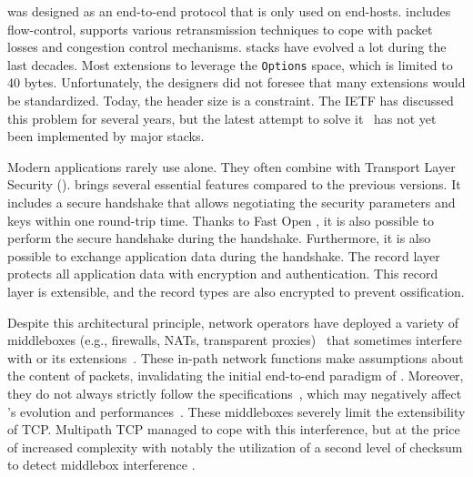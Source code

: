 

\tcp was designed as an end-to-end protocol that is only used on end-hosts.
\tcp includes flow-control, supports various retransmission techniques to cope 
with packet losses and congestion control mechanisms. \tcp stacks have evolved 
a lot during the last decades. Most extensions to \tcp leverage the \tcp 
\texttt{Options} space, which is limited to 40 bytes. Unfortunately, the \tcp 
designers did not foresee that many \tcp extensions would be standardized. 
Today, the \tcp header size is a constraint. The IETF has discussed this 
problem for several years, but the latest attempt to solve 
it~\cite{draft-ietf-tcpm-tcp-edo-10} has not yet been implemented by major 
\tcp stacks.

Modern applications rarely use \tcp alone. They
often combine \tcp with Transport Layer Security (\tls). 
 \cite{rfc8446} brings several essential features compared to the previous versions. It
includes a secure handshake that allows negotiating the security parameters and
keys within one round-trip time. Thanks to \tcp Fast Open
\cite{radhakrishnan2011tcp}, it is also possible to perform the secure handshake
during the \tcp handshake. Furthermore, it is also possible to exchange
application data during the handshake. The  record layer protects all
application data with encryption and authentication. This record layer is
extensible, and the \tls record types are also encrypted to prevent
ossification.

Despite this architectural principle, network operators have deployed a variety
of middleboxes (e.g., firewalls, NATs, transparent proxies)~\cite{mCloud} that
sometimes interfere with \tcp or its extensions~\cite{medina2004measuring,
honda2011still, edeline2019bottom}. These in-path network functions make
assumptions about the content of \tcp packets, invalidating the initial
end-to-end paradigm of \tcp. Moreover, they do not always strictly follow the
\tcp specifications~\cite{honda2011still, hesmans2013tcp}, which may negatively
affect \tcp's evolution and performances~\cite{edeline2020evaluating}. These
middleboxes severely limit the extensibility of TCP. Multipath TCP \cite{rfc8684,raiciu2012hard}
managed to cope with this interference, but at the price of increased complexity
with notably the utilization of a second level of checksum to detect middlebox
interference \cite{raiciu2012hard,hesmans2013tcp}.

